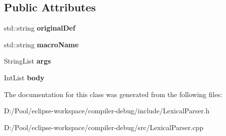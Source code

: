 \subsection*{Public Attributes}
\begin{DoxyCompactItemize}
\item 
\mbox{\label{class_define_preprocessor_a4a45d6d2656b32a06a034829815dfaa2}} 
std\+::string {\bfseries original\+Def}
\item 
\mbox{\label{class_define_preprocessor_aa380811e12d51b3fb0a484b1c99af10a}} 
std\+::string {\bfseries macro\+Name}
\item 
\mbox{\label{class_define_preprocessor_aab2b652146c89e2d1d031e142f215325}} 
String\+List {\bfseries args}
\item 
\mbox{\label{class_define_preprocessor_ae9127f4461cc7c20a84242abd7f45780}} 
Int\+List {\bfseries body}
\end{DoxyCompactItemize}


The documentation for this class was generated from the following files\+:\begin{DoxyCompactItemize}
\item 
D\+:/\+Pool/eclipse-\/workspace/compiler-\/debug/include/Lexical\+Parser.\+h\item 
D\+:/\+Pool/eclipse-\/workspace/compiler-\/debug/src/Lexical\+Parser.\+cpp\end{DoxyCompactItemize}
